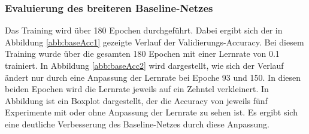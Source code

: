 \subsubsection{Evaluierung des breiteren Baseline-Netzes}
Das Training wird über 180 Epochen durchgeführt. Dabei ergibt sich der in Abbildung \ref{abb:baseAcc1} gezeigte Verlauf der Validierungs-Accuracy. Bei diesem Training wurde über die gesamten 180 Epochen mit einer Lernrate von 0.1 trainiert. In Abbildung \ref{abb:baseAcc2} wird dargestellt, wie sich der Verlauf ändert nur durch eine Anpassung der Lernrate bei Epoche 93 und 150. In diesen beiden Epochen wird die Lernrate jeweils auf ein Zehntel verkleinert. In Abbildung  ist ein Boxplot dargestellt, der die Accuracy von jeweils fünf Experimente mit oder ohne Anpassung der Lernrate zu sehen ist. Es ergibt sich eine deutliche Verbesserung des Baseline-Netzes durch diese Anpassung.


